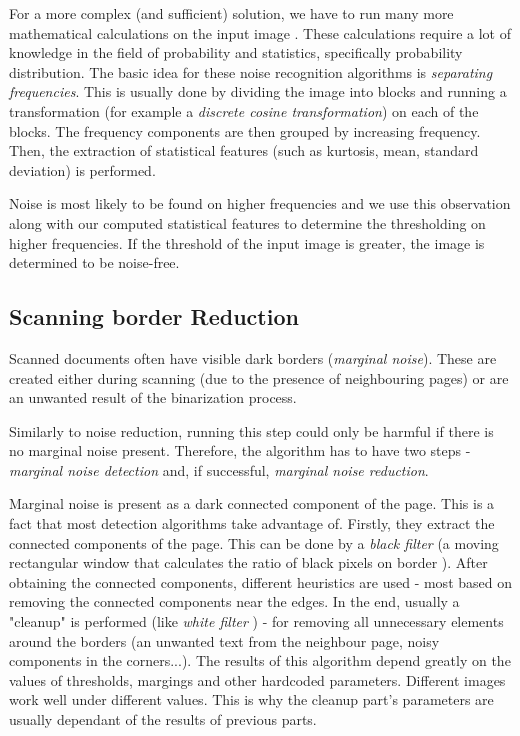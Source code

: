 For a more complex (and sufficient) solution, we have to run many more mathematical calculations on the input image \citep{noiseDetection}. These calculations require a lot of knowledge in the field of probability and statistics, specifically probability distribution. The basic idea for these noise recognition algorithms is \emph{separating frequencies}. This is usually done by dividing the image into blocks and running a transformation (for example a \emph{discrete cosine transformation}) on each of the blocks. The frequency components are then grouped by increasing frequency. Then, the extraction of statistical features (such as kurtosis, mean, standard deviation) is performed.

Noise is most likely to be found on higher frequencies and we use this observation along with our computed statistical features to determine the thresholding on higher frequencies. If the threshold of the input image is greater, the image is determined to be noise-free. 

\subsection{Scanning border Reduction}

Scanned documents often have visible dark borders (\emph{marginal noise}). These are created either during scanning (due to the presence of neighbouring pages) or are an unwanted result of the binarization process.

Similarly to noise reduction, running this step could only be harmful if there is no marginal noise present. Therefore, the algorithm has to have two steps - \emph{marginal noise detection} and, if successful, \emph{marginal noise reduction}.

Marginal noise is present as a dark connected component of the page. This is a fact that most detection algorithms take advantage of. Firstly, they extract the connected components of the page. This can be done by a \emph{black filter} (a moving rectangular window that calculates the ratio of black pixels on border \citep{marginalNoiseWindow}). After obtaining the connected components, different heuristics are used - most based on removing the connected components near the edges. In the end, usually a "cleanup" is performed (like \emph{white filter} \citep{marginalNoiseWindow}) - for removing all unnecessary elements around the borders (an unwanted text from the neighbour page, noisy components in the corners...).
The results of this algorithm depend greatly on the values of thresholds, margings and other hardcoded parameters. Different images work well under different values. This is why the cleanup part's parameters are usually dependant of the results of previous parts.

